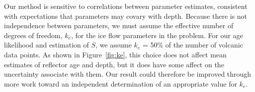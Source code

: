 Our method is sensitive to correlations between parameter estimates, consistent with expectations that parameters may covary with depth. Because there is not independence between parameters, we must assume the effective number of degrees of freedom, $k_e$, for the ice flow parameters in the problem.  For our age likelihood and estimation of $S$, we assume $k_e$ = 50\% of the number of volcanic data points. As shown in Figure~\ref{fig:ke}, this choice does not affect mean estimates of reflector age and depth, but it does have some affect on the uncertainty associate with them. Our result could therefore be improved through more work toward an independent determination of an appropriate value for $k_e$. 




